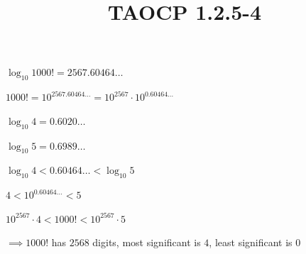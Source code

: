 \documentclass{article}
\title{TAOCP 1.2.5\mbox{-}4}
\begin{document}
\maketitle

\( \log_{10}{1000!} = 2567.60464\ldots \)

\( 1000! = 10^{2567.60464\ldots} = 10^{2567} \cdot 10^{0.60464\ldots} \)

\( \log_{10}{4} = 0.6020\ldots \)

\( \log_{10}{5} = 0.6989\ldots \)

\( \log_{10}{4} < 0.60464\ldots < \log_{10}{5} \)

\( 4 < 10^{0.60464\ldots} < 5 \)

\( 10^{2567} \cdot 4 < 1000! < 10^{2567} \cdot 5 \)

\( \implies 1000! \) has \( 2568 \) digits, most significant is \( 4 \), least significant is \( 0 \)
\end{document}
